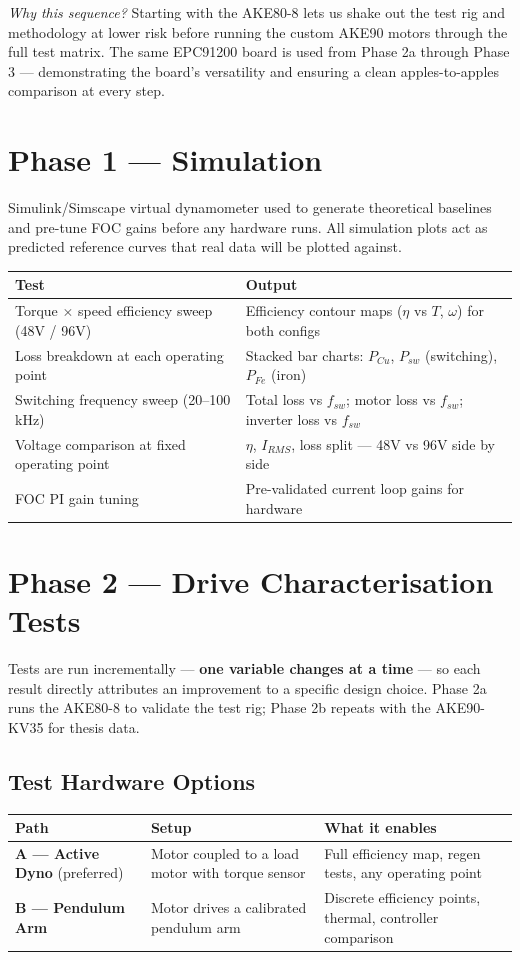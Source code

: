 \documentclass[11pt]{article}
\begin{document}
\vspace{0.3cm}
\noindent \textit{Why this sequence?} Starting with the AKE80-8 lets us shake out the test rig and methodology at lower risk before running the custom AKE90 motors through the full test matrix. The same EPC91200 board is used from Phase 2a through Phase 3 — demonstrating the board's versatility and ensuring a clean apples-to-apples comparison at every step.

\section*{Phase 1 — Simulation}
Simulink/Simscape virtual dynamometer used to generate theoretical baselines and pre-tune FOC gains before any hardware runs. All simulation plots act as predicted reference curves that real data will be plotted against.

\vspace{0.2cm}
\noindent
\begin{tabularx}{\textwidth}{@{}l X@{}}
\toprule
\textbf{Test} & \textbf{Output} \\
\midrule
Torque $\times$ speed efficiency sweep (48V / 96V) & Efficiency contour maps ($\eta$ vs $T$, $\omega$) for both configs \\
Loss breakdown at each operating point & Stacked bar charts: $P_{Cu}$, $P_{sw}$ (switching), $P_{Fe}$ (iron) \\
Switching frequency sweep (20–100 kHz) & Total loss vs $f_{sw}$; motor loss vs $f_{sw}$; inverter loss vs $f_{sw}$ \\
Voltage comparison at fixed operating point & $\eta$, $I_{RMS}$, loss split — 48V vs 96V side by side \\
FOC PI gain tuning & Pre-validated current loop gains for hardware \\
\bottomrule
\end{tabularx}

\section*{Phase 2 — Drive Characterisation Tests}
Tests are run incrementally — \textbf{one variable changes at a time} — so each result directly attributes an improvement to a specific design choice. Phase 2a runs the AKE80-8 to validate the test rig; Phase 2b repeats with the AKE90-KV35 for thesis data.

\subsection*{Test Hardware Options}
\noindent
\begin{tabularx}{\textwidth}{@{}l X X@{}}
\toprule
\textbf{Path} & \textbf{Setup} & \textbf{What it enables} \\
\midrule
\textbf{A — Active Dyno} (preferred) & Motor coupled to a load motor with torque sensor & Full efficiency map, regen tests, any operating point \\
\textbf{B — Pendulum Arm} & Motor drives a calibrated pendulum arm & Discrete efficiency points, thermal, controller comparison \\
\bottomrule
\end{tabularx}
\end{document}
